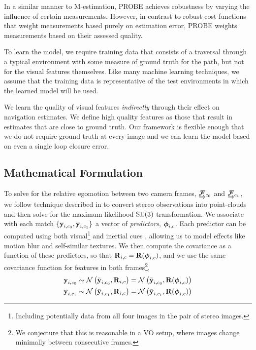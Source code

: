 In a similar manner to M-estimation, PROBE achieves robustness by varying the influence of certain measurements.
However, in contrast to robust cost functions that weight measurements based purely on estimation error, PROBE weights measurements based on their assessed quality.

To learn the model, we require training data that consists of a traversal through a typical environment with some measure of ground truth for the path, but not for the visual features themselves. Like many machine learning techniques, we assume that the training data is representative of the test environments in which the learned model will be used. 

We learn the quality of visual features \textit{indirectly} through their effect on navigation estimates. We define high quality features as those that result in estimates that are close to ground truth. Our framework is flexible enough that we do not require ground truth at every image and we can learn the model based on even a single loop closure error.


\subsection{Mathematical Formulation}



To solve for the relative egomotion between two camera frames, $\underrightarrow{ \boldsymbol{\mathbf{\mathcal{F}}} }_{c_0}$ and $\underrightarrow{ \boldsymbol{\mathbf{\mathcal{F}}} }_{c_1}$, we follow technique described in  to convert stereo observations into point-clouds and then solve for the maximum likelihood $\mathrm{SE}(3)$ transformation. We associate with each match $\{\boldsymbol{\mathbf{y}}_{i, c_0}, \boldsymbol{\mathbf{y}}_{i, c_1}\}$ a vector of
\emph{predictors}, $\boldsymbol{\mathbf{\phi}}_{i,c}$.  Each predictor can be computed using both visual\footnote{Including potentially data from all four images in the pair of stereo images.} and inertial cues , allowing us to model effects like motion blur and self-similar
textures. We then compute the covariance as a function of these predictors, so
that $\boldsymbol{\mathbf{R}}_{i,c} = \boldsymbol{\mathbf{R}}( \boldsymbol{\mathbf{\phi}}_{i,c})$, and we use the same covariance function for features in both frames\footnote{We conjecture that this is reasonable in a VO setup, where images change minimally between consecutive frames.},
\begin{align}
	\boldsymbol{\mathbf{y}}_{i, c_0} &\sim \mathcal{N}\left(\bar{\boldsymbol{\mathbf{y}}}_{i,c_0}, \boldsymbol{\mathbf{R}}_{i,c} \right) = \mathcal{N}\left(\bar{\boldsymbol{\mathbf{y}}}_{i,c_0}, \boldsymbol{\mathbf{R}}( \boldsymbol{\mathbf{\phi}}_{i,c})\right) \\
		\boldsymbol{\mathbf{y}}_{i, c_1} &\sim \mathcal{N}\left(\bar{\boldsymbol{\mathbf{y}}}_{i,c_1}, \boldsymbol{\mathbf{R}}_{i,c} \right) = \mathcal{N}\left(\bar{\boldsymbol{\mathbf{y}}}_{i,c_1}, \boldsymbol{\mathbf{R}}( \boldsymbol{\mathbf{\phi}}_{i,c})\right)
\end{align}


